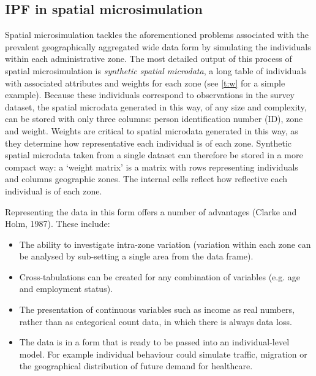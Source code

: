 \documentclass[a4paper,10pt]{article}
\begin{document}
\subsection{IPF in spatial microsimulation}
Spatial microsimulation tackles the aforementioned problems associated
with the prevalent geographically aggregated wide data form by simulating
the individuals within each administrative zone. The most detailed output of this process of
spatial microsimulation is \emph{synthetic spatial microdata}, a long table of individuals with
associated attributes and weights for each zone (see \cref{t:w} %
 for a simple example).
Because these individuals correspond to observations in the survey dataset,
the spatial microdata generated in this way, of any size and complexity,
can be stored with only three columns: person identification number (ID),
zone and weight. Weights are critical to spatial microdata generated in this way, as they
determine how representative each individual is of each zone.
Synthetic spatial microdata taken from a single dataset can therefore be
stored in a more compact way: a `weight matrix' is a matrix with rows representing
individuals and columns geographic zones. The internal cells reflect how reflective each
individual is of each zone.

Representing the data in this form offers a number of advantages
(Clarke and Holm, 1987). These include:
\begin{itemize}
 \item The ability to investigate intra-zone variation (variation within each zone can be analysed
 by sub-setting a single area from the data frame).
\item Cross-tabulations can be created for any combination of variables (e.g. age and employment status).
\item The presentation of continuous variables such as income as real numbers,
rather than as categorical count data, in which there is always data loss.
\item The data is in a form that is ready to be passed into an individual-level model.
For example individual behaviour could simulate traffic, migration or the geographical distribution of future demand for healthcare.
\end{itemize}
\end{document}
